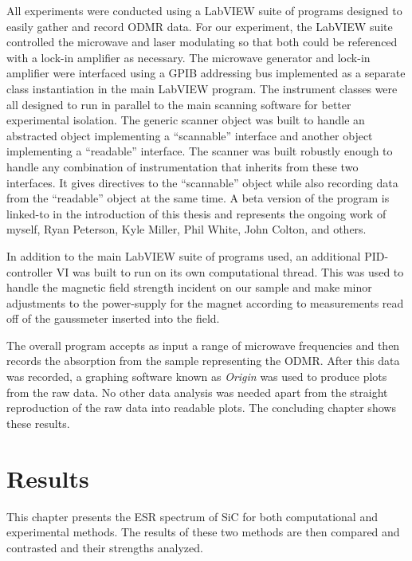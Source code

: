 \documentclass[oneside, noacknowlegments]{BYUPhys}
\begin{document}
All experiments were conducted using a LabVIEW suite of programs designed to easily gather and record ODMR data. For our experiment, the LabVIEW suite controlled the microwave and laser modulating so that both could be referenced with a lock-in amplifier as necessary. The microwave generator and lock-in amplifier were interfaced using a GPIB addressing bus implemented as a separate class instantiation in the main LabVIEW program. The instrument classes were all designed to run in parallel to the main scanning software for better experimental isolation. The generic scanner object was built to handle an abstracted object implementing a ``scannable'' interface and another object implementing a ``readable'' interface. The scanner was built robustly enough to handle any combination of instrumentation that inherits from these two interfaces. It gives directives to the ``scannable'' object while also recording data from the ``readable'' object at the same time. A beta version of the program is linked-to in the introduction of this thesis and represents the ongoing work of myself, Ryan Peterson, Kyle Miller, Phil White, John Colton, and others.

In addition to the main LabVIEW suite of programs used, an additional PID-controller VI was built to run on its own computational thread. This was used to handle the magnetic field strength incident on our sample and make minor adjustments to the power-supply for the magnet according to measurements read off of the gaussmeter inserted into the field.

The overall program accepts as input a range of microwave frequencies and then records the absorption from the sample representing the ODMR. After this data was recorded, a graphing software known as \textit{Origin} was used to produce plots from the raw data. No other data analysis was needed apart from the straight reproduction of the raw data into readable plots. The concluding chapter shows these results.










\chapter{Results}

This chapter presents the ESR spectrum of SiC for both computational and experimental methods. The results of these two methods are then compared and contrasted and their strengths analyzed.
\end{document}
